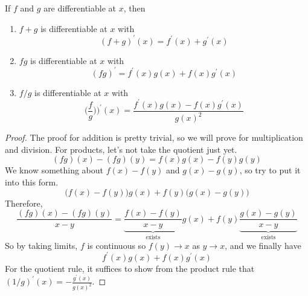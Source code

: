   \begin{lemma}[Arithmetic]
    If $f$ and $g$ are differentiable at $x$, then 
    \begin{enumerate}
      \item $f + g$ is differentiable at $x$ with 
        \begin{equation}
          (f + g)^\prime (x) = f^\prime (x) + g^\prime (x)
        \end{equation}
      \item $fg$ is differentiable at $x$ with 
        \begin{equation}
          (fg)^\prime = f^\prime (x) g(x) + f(x) g^\prime (x)
        \end{equation}
      \item $f/g$ is differentiable at $x$ with 
        \begin{equation}
          \bigg(\frac{f}{g}) \bigg)^\prime (x) = \frac{f^\prime(x) g(x) - f(x) g^\prime (x)}{g(x)^2}
        \end{equation}
    \end{enumerate}
  \end{lemma}
  \begin{proof}
    The proof for addition is pretty trivial, so we will prove for multiplication and division. For products, let's not take the quotient just yet. 
    \begin{equation}
      (fg)(x) - (fg)(y) = f(x) g(x) - f(y) g(y) 
    \end{equation}
    We know something about $f(x) - f(y)$ and $g(x) - g(y)$, so try to put it into this form. 
    \begin{equation}
      \big(f(x) - f(y) \big) g(x) + f(y) \big( g(x) - g(y) \big)
    \end{equation}
    Therefore, 
    \begin{equation}
      \frac{(fg)(x) - (fg) (y)}{x - y} = \underbrace{\frac{f(x) - f(y)}{x - y}}_{\text{exists}} g(x) + f(y) \underbrace{\frac{g(x) - g(y)}{x - y}}_{\text{exists}}
    \end{equation}
    So by taking limits, $f$ is continuous so $f(y) \to x$ as $y \to x$, and we finally have 
    \begin{equation}
      f^\prime (x) g(x) + f(x) g^\prime (x)
    \end{equation}
    For the quotient rule, it suffices to show from the product rule that $(1/g)^\prime (x) = - \frac{g^\prime (x)}{g(x)^2}$. 
  \end{proof}


